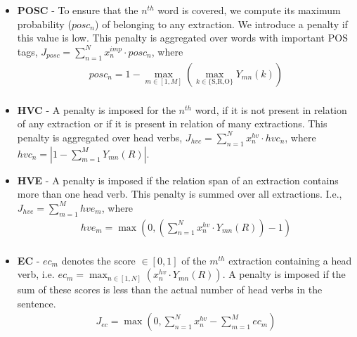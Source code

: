 \documentclass[11pt,a4paper]{article}
\begin{document}
\begin{itemize} 
    \item \textbf{POSC} - To ensure that the $n^{th}$ word is covered, we compute its maximum probability ($posc_n$) of belonging to any extraction. We introduce a penalty if this value is low. This penalty is aggregated over words with important POS tags, $J_{posc} = \sum_{n=1}^{N}x^{imp}_n \cdot posc_n$, where
    \begin{equation*} \label{constraint_pos}
    \begin{aligned}
        posc_n = 1 - \max_{m \in [1,M]}\left( \max_{k \in \{\text{S,R,O}\}}Y_{mn}(k)\right) \\
\end{aligned}
    \end{equation*}

    \item \textbf{HVC} - A penalty is imposed for the $n^{th}$ word, if it is not present in relation of any extraction 
    or if it is present in relation of many extractions.
This penalty is aggregated over head verbs, $J_{hvc} = \sum_{n=1}^{N}x^{hv}_n \cdot hvc_n$, where 
    $hvc_n = \left| 1 - \sum_{m=1}^M Y_{mn}(R)\right|$.


    \item \textbf{HVE} - A penalty is imposed if the relation span of an extraction contains more than one head verb. This penalty is summed over all extractions. I.e., $J_{hve} = \sum_{m=1}^{M} hve_{m}$, where
\begin{equation*}
    \begin{aligned}
        hve_m = \max\left(0, \left(\sum\limits_{n=1}^{N} x^{hv}_n \cdot Y_{mn}(R) \right) - 1 \right) \\
\end{aligned}
    \end{equation*}
\item \textbf{EC} - $ec_m$ denotes the score $\in [0,1]$ of the $m^{th}$ extraction containing a head verb, i.e. $ec_m = \max_{n \in [1,N]}\left( x^{hv}_n \cdot Y_{mn}(R)\right)$. A penalty is imposed if the sum of these scores is less than the actual number of head verbs in the sentence. 
\begin{equation*}
    \begin{aligned}
J_{ec} = \max\left(0, \sum_{n=1}^{N}x^{hv}_n - \sum_{m=1}^{M}ec_m\right)
    \end{aligned}
    \end{equation*}
\end{itemize}
\end{document}
